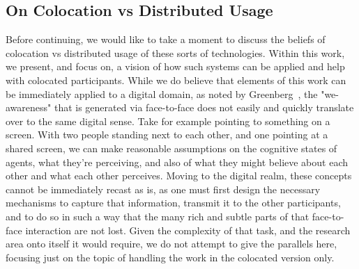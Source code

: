 \subsection{On Colocation vs Distributed Usage}

Before continuing, we would like to take a moment to discuss the beliefs of
colocation vs distributed usage of these sorts of technologies. Within this
work, we present, and focus on, a vision of how such systems can be applied and
help with colocated participants. While we do believe that elements of this work
can be immediately applied to a digital domain, as noted by
Greenberg~\cite{greenberg_implications_2016}, the "we-awareness" that is
generated via face-to-face does not easily and quickly translate over to the
same digital sense. Take for example pointing to something on a screen. With two
people standing next to each other, and one pointing at a shared screen, we can
make reasonable assumptions on the cognitive states of agents, what they're
perceiving, and also of what they might believe about each other and what each
other perceives. Moving to the digital realm, these concepts cannot be
immediately recast as is, as one must first design the necessary mechanisms to
capture that information, transmit it to the other participants, and to do so in
such a way that the many rich and subtle parts of that face-to-face interaction
are not lost. Given the complexity of that task, and the research area onto
itself it would require, we do not attempt to give the parallels here, focusing
just on the topic of handling the work in the colocated version only.
